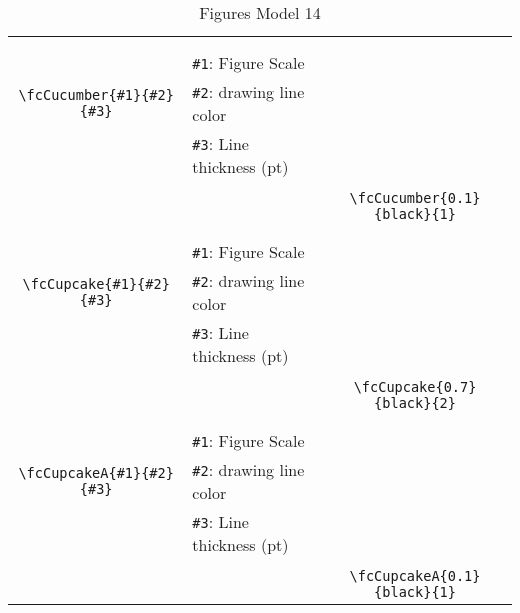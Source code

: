 \documentclass[x11names]{article}
\begin{document}
\begin{table}[H]
\begin{tabular}{|c|l|c|}
	&&\multirow{5}{*}{\fcCucumber{0.1}{black}{1}}\\	&&\\	&\verb|#1|: Figure Scale &\\	\verb|\fcCucumber{#1}{#2}{#3}|&	\verb|#2|: drawing line color &\\	&\verb|#3|: Line thickness (pt) &\\ &&\\&&	\verb|\fcCucumber{0.1}{black}{1}|\\\hline 	
	&&\multirow{5}{*}{\fcCupcake{0.7}{black}{2}}\\	&&\\	&\verb|#1|: Figure Scale &\\	\verb|\fcCupcake{#1}{#2}{#3}|&	\verb|#2|: drawing line color &\\	&\verb|#3|: Line thickness (pt) &\\ &&\\&&	\verb|\fcCupcake{0.7}{black}{2}|\\\hline 	
	&&\multirow{5}{*}{\fcCupcakeA{0.1}{black}{1}}\\	&&\\	&\verb|#1|: Figure Scale &\\	\verb|\fcCupcakeA{#1}{#2}{#3}|&	\verb|#2|: drawing line color &\\	&\verb|#3|: Line thickness (pt) &\\ &&\\&&	\verb|\fcCupcakeA{0.1}{black}{1}|\\\hline 	\hline\end{tabular}\caption{Figures Model 14}\label{tab14}\end{table}
\end{document}
